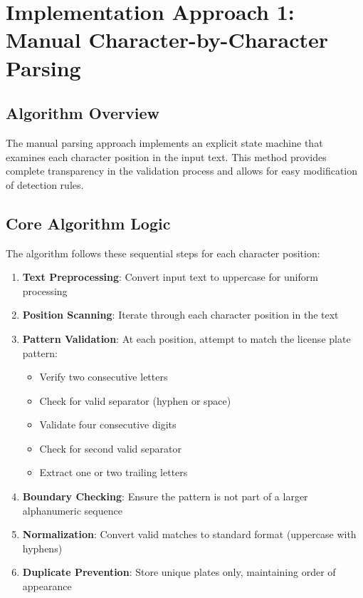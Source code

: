 \documentclass[12pt,a4paper]{article}
\begin{document}
\section{Implementation Approach 1: Manual Character-by-Character Parsing}
\subsection{Algorithm Overview}
The manual parsing approach implements an explicit state machine that examines each character position in the input text. This method provides complete transparency in the validation process and allows for easy modification of detection rules.

\subsection{Core Algorithm Logic}
The algorithm follows these sequential steps for each character position:

\begin{enumerate}
    \item \textbf{Text Preprocessing}: Convert input text to uppercase for uniform processing
    \item \textbf{Position Scanning}: Iterate through each character position in the text
    \item \textbf{Pattern Validation}: At each position, attempt to match the license plate pattern:
    \begin{itemize}
        \item Verify two consecutive letters
        \item Check for valid separator (hyphen or space)
        \item Validate four consecutive digits
        \item Check for second valid separator
        \item Extract one or two trailing letters
    \end{itemize}
    \item \textbf{Boundary Checking}: Ensure the pattern is not part of a larger alphanumeric sequence
    \item \textbf{Normalization}: Convert valid matches to standard format (uppercase with hyphens)
    \item \textbf{Duplicate Prevention}: Store unique plates only, maintaining order of appearance
\end{enumerate}
\end{document}
